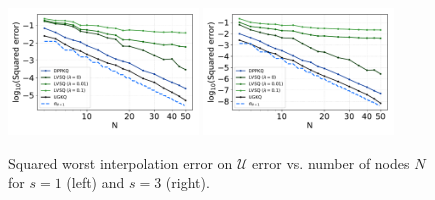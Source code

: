 \documentclass[twoside,11pt]{book}
\numberwithin{theorem}{chapter}
\numberwithin{definition}{chapter}
\numberwithin{proposition}{chapter}
\numberwithin{corollary}{chapter}
\numberwithin{example}{chapter}
\numberwithin{lemma}{chapter}
\numberwithin{assumption}{chapter}
\numberwithin{equation}{chapter}
\numberwithin{figure}{chapter}
\DeclareMathOperator{\X}{\mathcal{X}}
\begin{document}
\begin{figure}
\centering
\includegraphics[width=0.45\textwidth]{img/neurips/Sobolev/suponunitball_interpolation_pSobolev_s_2_randomvectors_200_fig_1.pdf}
\includegraphics[width=0.45\textwidth]{img/neurips/Sobolev/suponunitball_interpolation_pSobolev_s_3_randomvectors_2000_fig_1.pdf}\\
\caption{Squared worst interpolation error on $\mathcal{U}$ error vs. number of nodes $N$ for $s = 1$ (left) and $s=3$ (right).
\label{fig:pDPP_results_pSobolev_exp_3_G6}}
\end{figure}
\end{document}
